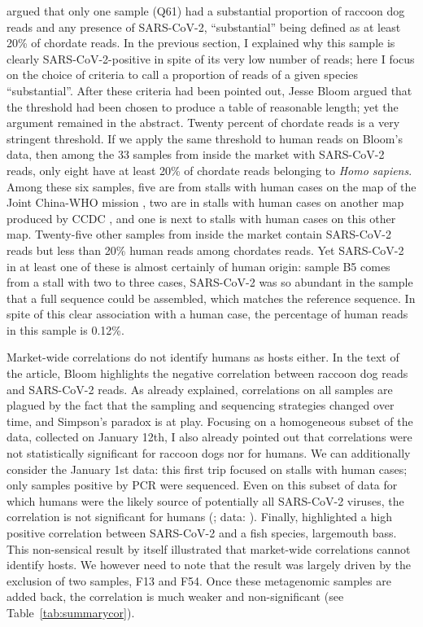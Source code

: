 \documentclass[11pt]{article}
\def \sct {\mbox{SARS-CoV-2}}
\begin{document}
 argued that only one sample (Q61) had a substantial proportion of raccoon dog reads and any presence of \sct{}, ``substantial'' being defined as at least 20\% of chordate reads. In the previous section, I explained why this sample is clearly \sct{}-positive in spite of its very low number of reads; here I focus on the choice of criteria to call a proportion of reads of a given species ``substantial''. After these criteria had been pointed out, Jesse Bloom argued that the threshold had been chosen to produce a table of reasonable length; yet the argument remained in the abstract. Twenty percent of chordate reads is a very stringent threshold. If we apply the same threshold to human reads on Bloom's data, then among the 33 samples from inside the market with \sct{} reads, only eight have at least 20\% of chordate reads belonging to \textit{Homo sapiens}. Among these six samples, five are from stalls with human cases on the map of the Joint China-WHO mission \citep{WHO2021}, two are in stalls with human cases on another map produced by CCDC \citep{Koopmans2021BMJ}, and one is next to stalls with human cases on this other map. Twenty-five other samples from inside the market contain \sct{} reads but less than 20\% human reads among chordates reads. Yet \sct{} in at least one of these is almost certainly of human origin: sample B5 comes from a stall with two to three cases, \sct{} was so abundant in the sample that a full sequence could be assembled, which matches the reference sequence. In spite of this clear association with a human case, the percentage of human reads in this sample is 0.12\%.
 
Market-wide correlations do not identify humans as hosts either. In the text of the article, Bloom highlights the negative correlation between raccoon dog reads and SARS-CoV-2 reads. As already explained, correlations on all samples are plagued by the fact that the sampling and sequencing strategies changed over time, and Simpson's paradox is at play. Focusing on a homogeneous subset of the data, collected on January 12th, I also already pointed out that correlations were not statistically significant for raccoon dogs nor for humans. We can additionally consider the January 1st data: this first trip focused on stalls with human cases; only samples positive by PCR were sequenced. Even on this subset of data for which humans were the likely source of potentially all SARS-CoV-2 viruses, the correlation is not significant for humans (\JBFirstSCHS{}; data: \citet{Bloom2023VE}). Finally, \citet{Bloom2023VE} highlighted a high positive correlation between \sct{} and a fish species, largemouth bass. This non-sensical result by itself illustrated that market-wide correlations cannot identify hosts. We however need to note that the result was largely driven by the exclusion of two samples, F13 and F54. Once these metagenomic samples are added back, the correlation is much weaker and non-significant (see Table~\ref{tab:summarycor}). 
\end{document}

